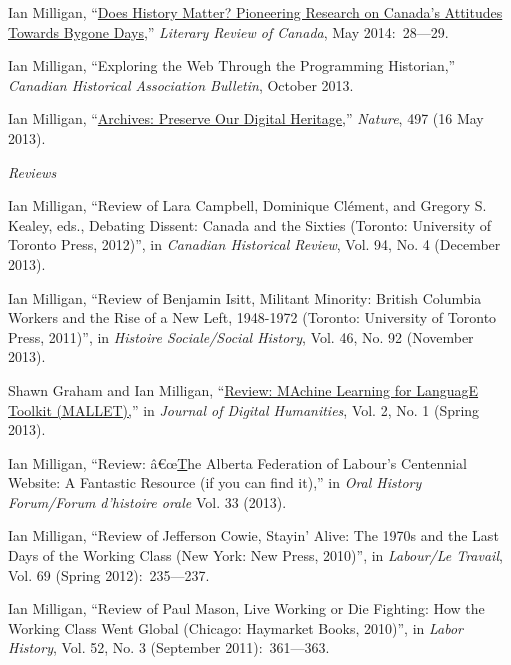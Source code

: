 \documentclass[11pt,article,oneside]{memoir}
\begin{document}
\ind Ian Milligan, ``\href{http://reviewcanada.ca/magazine/2014/05/does-history-matter/}{Does History Matter? Pioneering Research on Canada's Attitudes Towards Bygone Days},'' \emph{Literary Review of Canada}, May 2014:~28---29.

\ind Ian Milligan, ``Exploring the Web Through the Programming Historian,'' \emph{Canadian Historical Association Bulletin}, October 2013.

\ind Ian Milligan, ``\href{http://www.nature.com/nature/journal/v497/n7449/full/497317b.html}{Archives: Preserve Our Digital Heritage},'' \emph{Nature}, 497 (16 May 2013). 

\bigskip 

\noindent\emph{Reviews \vspace{0.05in}}


\ind Ian Milligan, ``Review of Lara Campbell, Dominique Cl\'ement, and Gregory S. Kealey, eds., Debating Dissent: Canada and the Sixties (Toronto: University of Toronto Press, 2012)'', in \emph{Canadian Historical Review}, Vol. 94, No. 4 (December 2013).

\ind Ian Milligan, ``Review of Benjamin Isitt, Militant Minority: British Columbia Workers and the Rise of a New Left, 1948-1972 (Toronto: University of Toronto Press, 2011)'', in \emph{Histoire Sociale/Social History}, Vol. 46, No. 92 (November 2013).

\ind Shawn Graham and Ian Milligan, ``\href{http://journalofdigitalhumanities.org/2-1/review-mallet-by-ian-milligan-and-shawn-graham/}{Review: MAchine Learning for LanguagE Toolkit (MALLET),}'' in \emph{Journal of Digital Humanities}, Vol. 2, No. 1 (Spring 2013).

\ind Ian Milligan, ``Review: â€œ\href{http://www.oralhistoryforum.ca/index.php/ohf/article/view/467/545}The Alberta Federation of Labour's Centennial Website: A Fantastic Resource (if you can find it),'' in \emph{Oral History Forum/Forum d'histoire orale} Vol. 33 (2013).

\ind Ian Milligan, ``Review of Jefferson Cowie, Stayin' Alive: The 1970s and the Last Days of the Working Class (New York: New Press, 2010)'', in \emph{Labour/Le Travail}, Vol. 69 (Spring 2012):~235---237.

\ind Ian Milligan, ``Review of Paul Mason, Live Working or Die Fighting: How the Working Class Went Global (Chicago: Haymarket Books, 2010)'', in \emph{Labor History}, Vol. 52, No. 3 (September 2011):~361---363.
\end{document}
